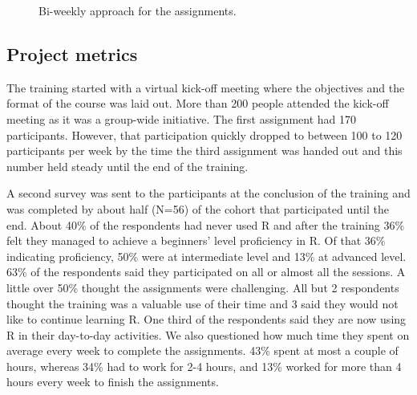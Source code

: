 \begin{figure}[htbp]
  \centering
  \caption{Bi-weekly approach for the assignments.}
  \label{figure_workflow}
\end{figure}

\hypertarget{project-metrics}{%
\subsection{Project metrics}\label{project-metrics}}

The training started with a virtual kick-off meeting where the
objectives and the format of the course was laid out. More than 200
people attended the kick-off meeting as it was a group-wide initiative.
The first assignment had 170 participants. However, that participation
quickly dropped to between 100 to 120 participants per week by the time
the third assignment was handed out and this number held steady until
the end of the training.

A second survey was sent to the participants at the conclusion of the
training and was completed by about half (N=56) of the cohort that
participated until the end. About 40\% of the respondents had never used
R and after the training 36\% felt they managed to achieve a beginners'
level proficiency in R. Of that 36\% indicating proficiency, 50\% were
at intermediate level and 13\% at advanced level. 63\% of the
respondents said they participated on all or almost all the sessions. A
little over 50\% thought the assignments were challenging. All but 2
respondents thought the training was a valuable use of their time and 3
said they would not like to continue learning R. One third of the
respondents said they are now using R in their day-to-day activities. We
also questioned how much time they spent on average every week to
complete the assignments. 43\% spent at most a couple of hours, whereas
34\% had to work for 2-4 hours, and 13\% worked for more than 4 hours
every week to finish the assignments.


